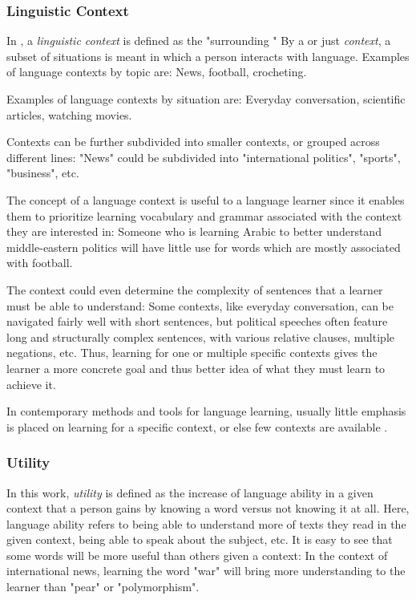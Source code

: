 \subsubsection{Linguistic Context}
In , a \textit{linguistic context} is defined as the "surrounding "
By a  or just \textit{context}, a subset of situations is meant in which a person interacts with language.
Examples of language contexts by topic are:
News, football, crocheting.

Examples of language contexts by situation are:
Everyday conversation, scientific articles, watching movies.

Contexts can be further subdivided into smaller contexts, or grouped across different lines:
"News" could be subdivided into "international politics", "sports", "business", etc.

The concept of a language context is useful to a language learner since it enables them to prioritize learning vocabulary and grammar associated with the context they are interested in:
Someone who is learning Arabic to better understand middle-eastern politics will have little use for words which are mostly associated with football.

The context could even determine the complexity of sentences that a learner must be able to understand:
Some contexts, like everyday conversation, can be navigated fairly well with short sentences, but political speeches often feature long and structurally complex sentences, with various relative clauses, multiple negations, etc. 
Thus, learning for one or multiple specific contexts gives the learner a more concrete goal and thus better idea of what they must learn to achieve it.

In contemporary methods and tools for language learning, usually little emphasis is placed on learning for a specific context, or else few contexts are available .

\subsubsection{Utility}
In this work, \textit{utility} is defined as the increase of language ability in a given context that a person gains by knowing a word versus not knowing it at all.
Here, language ability refers to being able to understand more of texts they read in the given context, being able to speak about the subject, etc.
It is easy to see that some words will be more useful than others given a context:
In the context of international news, learning the word "war" will bring more understanding to the learner than "pear" or "polymorphism".

